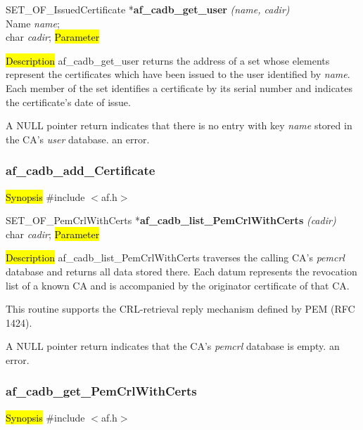 SET\_OF\_IssuedCertificate *{\bf af\_cadb\_get\_user} {\em (name, cadir)} \\
Name {\em *name}; \\
char {\em *cadir};
\hl{Parameter}


\hl{Description}
af\_cadb\_get\_user returns the address of a set whose elements represent the certificates 
which have been issued to the user identified by {\em name}. Each member of the set identifies
a certificate by its serial number and indicates the certificate's date of issue.

A NULL pointer return indicates
\bi
\m that there is no entry with key {\em name} stored in the CA's {\em user} database.
\m an error.
\ei



\subsubsection{af\_cadb\_add\_Certificate}
\label{af_cadb_list_PemCrlWithCerts}
\hl{Synopsis}
\#include $<$af.h$>$

SET\_OF\_PemCrlWithCerts *{\bf af\_cadb\_list\_PemCrlWithCerts} {\em (cadir)} \\
char	{\em *cadir};
\hl{Parameter}

\hl{Description}
af\_cadb\_list\_PemCrlWithCerts traverses the calling CA's {\em pemcrl} database and returns all data
stored there. Each datum represents the revocation list of a known CA and is accompanied by
the originator certificate of that CA.

This routine supports the CRL-retrieval reply mechanism defined by PEM (RFC 1424).

A NULL pointer return indicates
\bi
\m that the CA's {\em pemcrl} database is empty.
\m an error.
\ei




\subsubsection{af\_cadb\_get\_PemCrlWithCerts}
\label{af_cadb_list_user}
\hl{Synopsis}
\#include $<$af.h$>$


